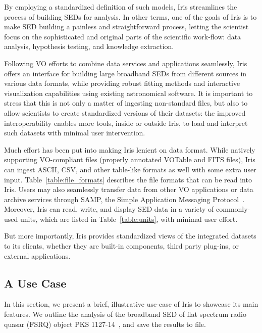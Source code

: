 \documentclass[preprint,authoryear,5p]{elsarticle}
\begin{document}
By employing a standardized definition of such models, Iris streamlines
the process of building SEDs for analysis. In other terms, one of the goals of
Iris is to make SED building a painless and straightforward process, letting the
scientist focus on the sophisticated and original parts of the scientific
work-flow: data analysis, hypothesis testing, and knowledge extraction.

Following VO efforts to combine data services and applications seamlessly, Iris
offers an interface for building large broadband SEDs from different sources in
various data formats, while providing robust fitting methods and interactive
visualization capabilities using existing astronomical software.
It is important to stress that this is not only a matter of ingesting
non-standard files, but also to allow scientists to create standardized versions
of their datasets: the improved interoperability enables more tools, inside or
outside Iris, to load and interpret such datasets with minimal user
intervention.

\begin{sloppypar}
Much effort has been put into making Iris lenient on data format. While natively
supporting VO-compliant files (properly annotated
VOTable and FITS files), Iris can ingest ASCII, CSV,
and other table-like formats as well with some extra user input.
Table~\ref{table:file_formats}
describes the file formats that can be read into Iris. Users may also
seamlessly transfer data from other VO applications or data archive services
through SAMP, the Simple Application Messaging
Protocol~\citep{2011arXiv1110.0528T}. Moreover, Iris can read, write, and display SED data in
a variety of commonly-used units, which are listed in Table~\ref{table:units}, with minimal user effort.

\end{sloppypar}

But more importantly, Iris provides standardized views of the integrated
datasets to its clients, whether they are built-in components, third party
plug-ins, or external applications.

\subsection{A Use Case} \label{subsec:usecase}

In this section, we present a brief, illustrative use-case
of Iris to showcase its main features. We outline the analysis of the broadband SED
of flat spectrum radio quasar (FSRQ) object PKS 1127-14~\citep[see][]{2004ApJ...600L..27B}, and save the
results to file.
\end{document}

